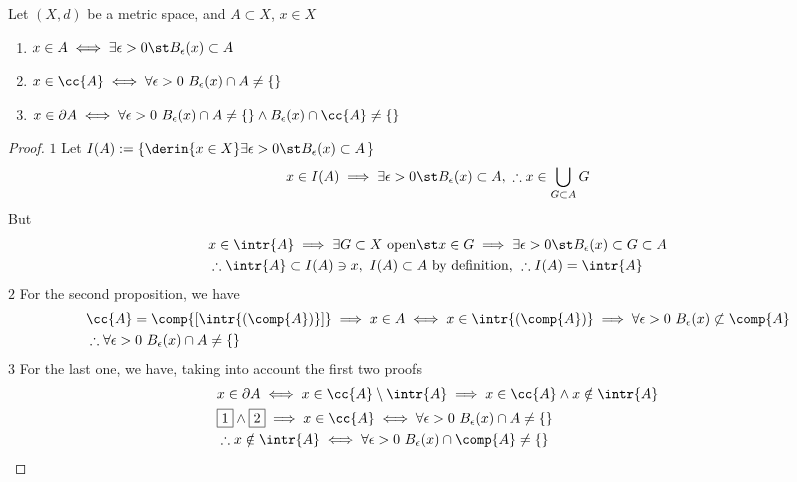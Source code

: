 \documentclass[../mmf.tex]{subfiles}
\begin{document}
\begin{prop}
	Let $(X,d)$ be a metric space, and $A\subset X$, $x\in X$
	\begin{enumerate}
	\item $x\in A\iff\exists\epsilon>0\st B_\epsilon(x)\subset A$
	\item $x\in\cc{A}\iff\forall\epsilon>0\ B_\epsilon(x)\cap A\ne\{\}$
	\item $x\in\partial A\iff\forall\epsilon>0\ B_\epsilon(x)\cap A\ne\{\}\wedge B_\epsilon(x)\cap\cc{A}\ne\{\}$
	\end{enumerate}
\end{prop}
\begin{proof}
		$\boxed{1}$ Let $I(A):=\{\derin{x\in X}\exists\epsilon>0\st B_\epsilon(x)\subset A$\}\\
		\begin{equation*}
			x\in I(A)\implies{}\exists\epsilon>0\st B_\epsilon(x)\subset A,\ \therefore x\in\bigcup_{G\subset A}G
		\end{equation*}
		But
		\begin{equation*}
			\begin{aligned}
				&x\in\intr{A}\implies{}\exists G\subset X\text{ open}\st x\in G\implies{}\exists\epsilon>0\st B_\epsilon(x)\subset G\subset A\\
				&\therefore\intr{A}\subset I(A)\ni x,\ I(A)\subset A\text{ by definition, }\therefore I(A)=\intr{A}
			\end{aligned}
		\end{equation*}
		$\boxed{2}$ For the second proposition, we have
		\begin{equation*}
			\begin{aligned}
				&\cc{A}=\comp{\left[ \intr{\left( \comp{A} \right)} \right]}\implies{} x\in A\iff x\in\intr{\left( \comp{A} \right)}\implies{}\forall\epsilon>0\ B_\epsilon(x)\not\subset\comp{A}\\
				&\therefore\forall\epsilon>0\ B_\epsilon(x)\cap A\ne\{\}
			\end{aligned}
		\end{equation*}
		$\boxed{3}$ For the last one, we have, taking into account the first two proofs
		\begin{equation*}
			\begin{aligned}
				&x\in\partial A\iff x\in\cc{A}\setminus\intr{A}\implies{} x\in\cc{A}\wedge x\notin\intr{A}\\
				&\boxed{1}\wedge\boxed{2}\implies{} x\in\cc{A}\iff\forall\epsilon>0\ B_\epsilon(x)\cap A\ne\{\}\\
				&\therefore x\notin\intr{A}\iff\forall\epsilon>0\ B_\epsilon(x)\cap\comp{A}\ne\{\}
			\end{aligned}
		\end{equation*}
\end{proof}
\end{document}
